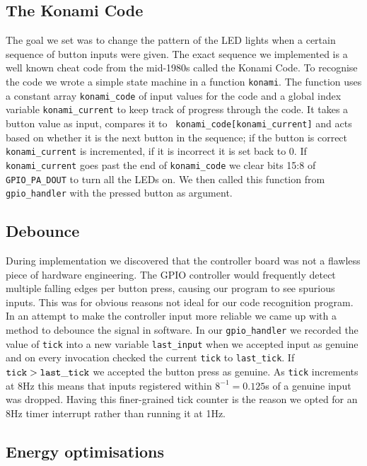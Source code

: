 \subsection{The Konami Code}

The goal we set was to change the pattern of the LED lights when a certain
sequence of button inputs were given. The exact sequence we implemented is a
well known cheat code from the mid-1980s called the Konami Code. To recognise
the code we wrote a simple state machine in a function {\tt konami}. The
function uses a constant array {\tt konami\_code} of input values for the code
and a global index variable {\tt konami\_current} to keep track of progress
through the code. It takes a button value as input, compares it to {\tt
konami\_code[konami\_current]} and acts based on whether it is the next button
in the sequence; if the button is correct {\tt konami\_current} is incremented,
if it is incorrect it is set back to 0. If {\tt konami\_current} goes past the
end of {\tt konami\_code} we clear bits 15:8 of {\tt GPIO\_PA\_DOUT} to turn all
the LEDs on. We then called this function from {\tt gpio\_handler} with the
pressed button as argument.

\subsection{Debounce}

During implementation we discovered that the controller board was not a flawless
piece of hardware engineering. The GPIO controller would frequently detect
multiple falling edges per button press, causing our program to see spurious
inputs. This was for obvious reasons not ideal for our code recognition program.
In an attempt to make the controller input more reliable we came up with a
method to debounce the signal in software. In our {\tt gpio\_handler} we
recorded the value of {\tt tick} into a new variable {\tt last\_input} when we
accepted input as genuine and on every invocation checked the current {\tt tick}
to {\tt last\_tick}. If \({\tt tick} > {\tt last\_tick}\) we accepted the button
press as genuine. As {\tt tick} increments at 8Hz this means that inputs
registered within \(8^{-1} = 0.125\)s of a genuine input was dropped. Having
this finer-grained tick counter is the reason we opted for an 8Hz timer
interrupt rather than running it at 1Hz.

\subsection{Energy optimisations}

